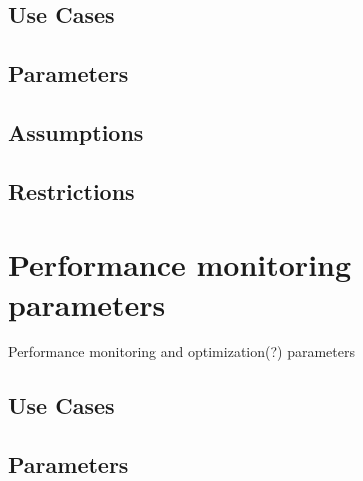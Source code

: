 \documentclass{book}
\begin{document}
\subsection{Use Cases}
\subsection{Parameters}
\subsection{Assumptions}
\subsection{Restrictions}

\section{Performance monitoring parameters} \label{s:performance}

Performance monitoring and optimization(?) parameters

\subsection{Use Cases}
\subsection{Parameters}
\end{document}
